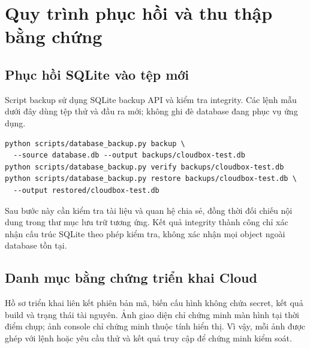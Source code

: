 \chapter{Quy trình phục hồi và thu thập bằng chứng}
\section{Phục hồi SQLite vào tệp mới}
Script backup sử dụng SQLite backup API và kiểm tra integrity. Các lệnh mẫu dưới đây dùng tệp thử và đầu ra mới; không ghi đè database đang phục vụ ứng dụng.
\begin{verbatim}
python scripts/database_backup.py backup \
  --source database.db --output backups/cloudbox-test.db
python scripts/database_backup.py verify backups/cloudbox-test.db
python scripts/database_backup.py restore backups/cloudbox-test.db \
  --output restored/cloudbox-test.db
\end{verbatim}
Sau bước này cần kiểm tra tài liệu và quan hệ chia sẻ, đồng thời đối chiếu nội dung trong thư mục lưu trữ tương ứng. Kết quả integrity thành công chỉ xác nhận cấu trúc SQLite theo phép kiểm tra, không xác nhận mọi object ngoài database tồn tại.
\section{Danh mục bằng chứng triển khai Cloud}
Hồ sơ triển khai liên kết phiên bản mã, biến cấu hình không chứa secret, kết quả build và trạng thái tài nguyên. Ảnh giao diện chỉ chứng minh màn hình tại thời điểm chụp; ảnh console chỉ chứng minh thuộc tính hiển thị. Vì vậy, mỗi ảnh được ghép với lệnh hoặc yêu cầu thử và kết quả truy cập để chứng minh kiểm soát.

